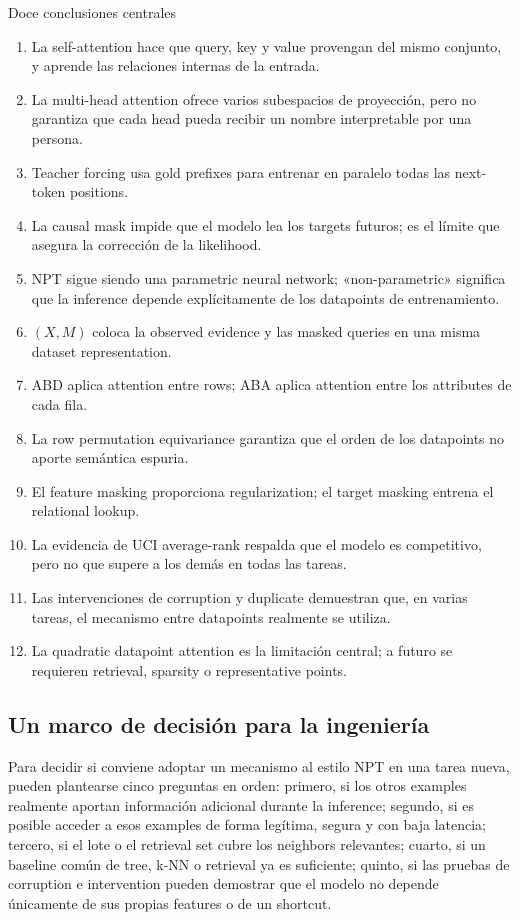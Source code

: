 \documentclass[a4paper]{article}
\begin{document}
\begin{importantbox}{Doce conclusiones centrales}
\begin{enumerate}
  \item La self-attention hace que query, key y value provengan del mismo conjunto, y aprende las relaciones internas de la entrada.
  \item La multi-head attention ofrece varios subespacios de proyección, pero no garantiza que cada head pueda recibir un nombre interpretable por una persona.
  \item Teacher forcing usa gold prefixes para entrenar en paralelo todas las next-token positions.
  \item La causal mask impide que el modelo lea los targets futuros; es el límite que asegura la corrección de la likelihood.
  \item NPT sigue siendo una parametric neural network; «non-parametric» significa que la inference depende explícitamente de los datapoints de entrenamiento.
  \item $(X,M)$ coloca la observed evidence y las masked queries en una misma dataset representation.
  \item ABD aplica attention entre rows; ABA aplica attention entre los attributes de cada fila.
  \item La row permutation equivariance garantiza que el orden de los datapoints no aporte semántica espuria.
  \item El feature masking proporciona regularization; el target masking entrena el relational lookup.
  \item La evidencia de UCI average-rank respalda que el modelo es competitivo, pero no que supere a los demás en todas las tareas.
  \item Las intervenciones de corruption y duplicate demuestran que, en varias tareas, el mecanismo entre datapoints realmente se utiliza.
  \item La quadratic datapoint attention es la limitación central; a futuro se requieren retrieval, sparsity o representative points.
\end{enumerate}
\end{importantbox}

\subsection{Un marco de decisión para la ingeniería}

Para decidir si conviene adoptar un mecanismo al estilo NPT en una tarea nueva, pueden plantearse cinco preguntas en orden: primero, si los otros examples realmente aportan información adicional durante la inference; segundo, si es posible acceder a esos examples de forma legítima, segura y con baja latencia; tercero, si el lote o el retrieval set cubre los neighbors relevantes; cuarto, si un baseline común de tree, k-NN o retrieval ya es suficiente; quinto, si las pruebas de corruption e intervention pueden demostrar que el modelo no depende únicamente de sus propias features o de un shortcut.
\end{document}
